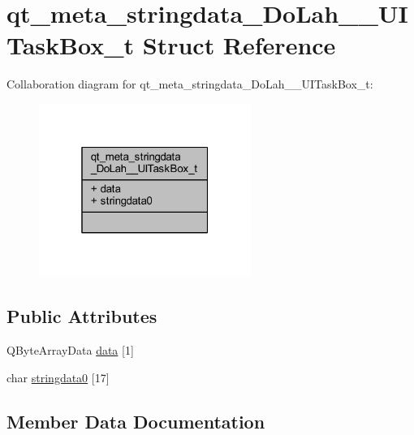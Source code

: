 \hypertarget{structqt__meta__stringdata___do_lah_____u_i_task_box__t}{}\section{qt\+\_\+meta\+\_\+stringdata\+\_\+\+Do\+Lah\+\_\+\+\_\+\+U\+I\+Task\+Box\+\_\+t Struct Reference}
\label{structqt__meta__stringdata___do_lah_____u_i_task_box__t}


Collaboration diagram for qt\+\_\+meta\+\_\+stringdata\+\_\+\+Do\+Lah\+\_\+\+\_\+\+U\+I\+Task\+Box\+\_\+t\+:\nopagebreak
\begin{figure}[H]
\begin{center}
\leavevmode
\includegraphics[width=196pt]{structqt__meta__stringdata___do_lah_____u_i_task_box__t__coll__graph}
\end{center}
\end{figure}
\subsection*{Public Attributes}
\begin{DoxyCompactItemize}
\item 
Q\+Byte\+Array\+Data \hyperlink{structqt__meta__stringdata___do_lah_____u_i_task_box__t_a4602ec97c04eb7890eda1caebc19e022}{data} \mbox{[}1\mbox{]}
\item 
char \hyperlink{structqt__meta__stringdata___do_lah_____u_i_task_box__t_a5d50b38f4a21565219216ef19a1d314d}{stringdata0} \mbox{[}17\mbox{]}
\end{DoxyCompactItemize}


\subsection{Member Data Documentation}
\hypertarget{structqt__meta__stringdata___do_lah_____u_i_task_box__t_a4602ec97c04eb7890eda1caebc19e022}{}
